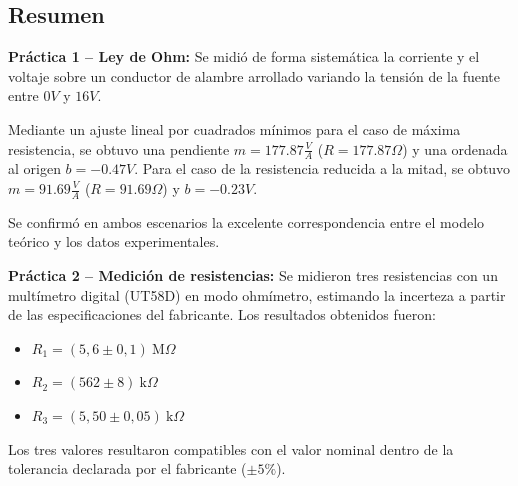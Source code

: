 \subsection{Resumen}
\label{subsec:resumen}


\textbf{Práctica 1 -- Ley de Ohm:} Se midió de forma sistemática la corriente y el voltaje sobre un conductor de alambre arrollado variando la tensión de la fuente entre $0 V$ y $16 V$.

Mediante un ajuste lineal por cuadrados mínimos para el caso de máxima resistencia, se obtuvo una pendiente $m=177.87 \frac{V}{A}$ ($R=177.87 \varOmega$) y una ordenada al origen $b=-0.47 V$.
Para el caso de la resistencia reducida a la mitad, se obtuvo $m=91.69 \frac{V}{A}$ ($R=91.69 \varOmega$) y $b=-0.23 V$.

Se confirmó en ambos escenarios la excelente correspondencia entre el modelo teórico y los datos experimentales.


\textbf{Práctica 2 -- Medición de resistencias:} Se midieron tres resistencias con un multímetro digital (UT58D) en modo ohmímetro, estimando la incerteza a partir de las especificaciones del fabricante. Los resultados obtenidos fueron:

\begin{itemize}
    \item $R_1 = (5{,}6 \pm 0{,}1)\ \text{M}\Omega$
    \item $R_2 = (562 \pm 8)\ \text{k}\Omega$
    \item $R_3 = (5{,}50 \pm 0{,}05)\ \text{k}\Omega$
\end{itemize}

Los tres valores resultaron compatibles con el valor nominal dentro de la tolerancia declarada por el fabricante ($\pm 5\%$).


